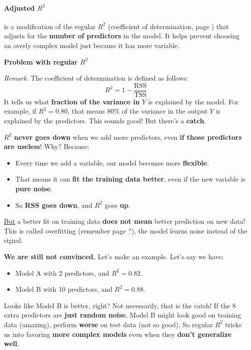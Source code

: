 \paragraph{\texorpdfstring{Adjusted $R^2$}{Adjusted R2}}\label{paragraph: Adjusted R2}

 is a modification of the regular $R^2$ (coefficient of determination, page \pageref{eq: coefficient of determination}) that adjusts for the \textbf{number of predictors} in the model. It helps prevent choosing an overly complex model just because it has more variable.

\highspace
\begin{flushleft}
    \textcolor{Red2}{ \textbf{Problem with regular $R^2$}}
\end{flushleft}
\emph{Remark}. The coefficient of determination is defined as follows:
\begin{equation*}
    R^2 = 1 - \frac{\text{RSS}}{\text{TSS}}
\end{equation*}
It tells us what \textbf{fraction of the variance in} $Y$ is explained by the model. For example, if $R^2 = 0.80$, that means $80\%$ of the variance in the output $Y$ is explained by the predictors. This sounds good! But there's a \textbf{catch}.

\highspace
$R^2$ \textbf{never goes down} when we add more predictors, even \textbf{if those predictors are useless}! Why? Because:
\begin{itemize}
    \item Every time we add a variable, our model becomes more \textbf{flexible}.
    \item That means it can \textbf{fit the training data better}, even if the new variable is \textbf{pure noise}.
    \item So \textbf{RSS goes down}, and $R^2$ goes \textbf{up}.
\end{itemize}
\underline{But} a better fit on training data \textbf{does not mean} better prediction on new data! This is called overfitting (remember page \pageref{def: Overfitting}?), the model learns noise instead of the signal.

\highspace
\textcolor{Green3}{ \textbf{We are still not convinced.}} Let's make an example. Let's say we have:
\begin{itemize}
    \item Model A with 2 predictors, and $R^2 = 0.82$.
    \item Model B with 10 predictors, and $R^2 = 0.88$.
\end{itemize}
Looks like Model B is better, right? Not necessarily, that is the catch! If the 8 extra predictors are \textbf{just random noise}, Model B might look good on training data (amazing), perform \textbf{worse} on test data (not so good). So regular $R^2$ tricks us into favoring \textbf{more complex models} even when they \textbf{don't generalize well}.

